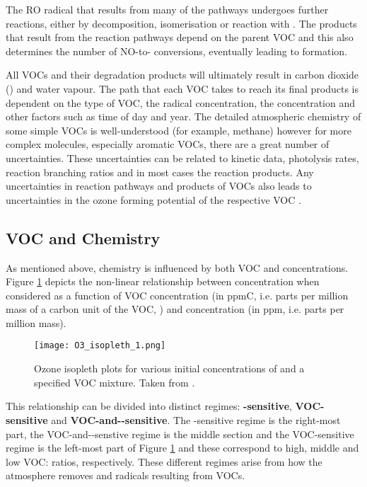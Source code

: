 The RO radical that results from many of the  pathways undergoes further reactions, either by decomposition, 
isomerisation or reaction with . The products that result from the reaction pathways depend on the parent VOC and this 
also determines the number of NO-to- conversions, eventually leading to  formation.

All VOCs and their degradation products will ultimately result in carbon dioxide () and water vapour. The path that 
each VOC takes to reach its final products is dependent on the type of VOC, the radical concentration, the  
concentration and other factors such as time of day and year. The detailed atmospheric chemistry of some simple VOCs is 
well-understood (for example, methane) however for more complex molecules, especially aromatic VOCs, there are a great number 
of uncertainties. These uncertainties can be related to kinetic data, photolysis rates, reaction branching ratios and in most 
cases the reaction products. Any uncertainties in reaction pathways and products of VOCs also leads to uncertainties in the 
ozone forming potential of the respective VOC \citep{Atkinson:2000}.

\subsection{\texorpdfstring{VOC and  Chemistry}{VOC and NOx Chemistry}} \label{s:VOC&NOx}
As mentioned above,  chemistry is influenced by both VOC and  concentrations. Figure \ref{f:O3_isopleth} 
depicts the non-linear relationship between  concentration when considered as a function of VOC concentration (in ppmC, 
i.e. parts per million mass of a carbon unit of the VOC, ) and  concentration (in ppm, i.e. parts per 
million mass). 
\begin{figure}
	\begin{center}
		\texttt{[image: O3\_isopleth\_1.png]}
		\caption{Ozone isopleth plots for various initial concentrations of  and a specified VOC mixture. Taken from \citep{Jenkin:2000}.}
		\label{f:O3_isopleth}
	\end{center}
\end{figure}

This relationship can be divided into distinct regimes: \textbf{-sensitive}, \textbf{VOC-sensitive} and 
\textbf{VOC-and--sensitive}. The -sensitive regime is the right-most part, the VOC-and--senstive 
regime is the middle section and the VOC-sensitive regime is the left-most part of Figure \ref{f:O3_isopleth} and these 
correspond to high, middle and low VOC: ratios, respectively.  These different regimes arise from how the atmosphere 
removes  and radicals resulting from VOCs. 

